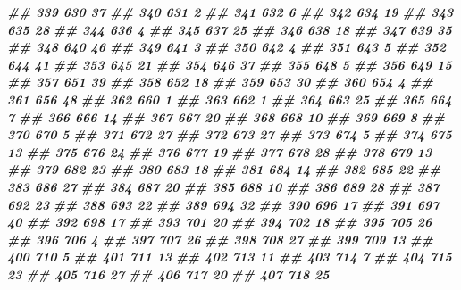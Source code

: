 \documentclass[
]{book}
\newenvironment{Shaded}{\begin{snugshade}}{\end{snugshade}}
\newcommand{\DocumentationTok}[1]{\textcolor[rgb]{0.56,0.35,0.01}{\textbf{\textit{#1}}}}
\theoremstyle{definition}
\theoremstyle{definition}
\theoremstyle{definition}
\theoremstyle{definition}
\theoremstyle{remark}
\begin{document}
\begin{Shaded}
\begin{Highlighting}[]
\DocumentationTok{\#\# 339    630 37}
\DocumentationTok{\#\# 340    631  2}
\DocumentationTok{\#\# 341    632  6}
\DocumentationTok{\#\# 342    634 19}
\DocumentationTok{\#\# 343    635 28}
\DocumentationTok{\#\# 344    636  4}
\DocumentationTok{\#\# 345    637 25}
\DocumentationTok{\#\# 346    638 18}
\DocumentationTok{\#\# 347    639 35}
\DocumentationTok{\#\# 348    640 46}
\DocumentationTok{\#\# 349    641  3}
\DocumentationTok{\#\# 350    642  4}
\DocumentationTok{\#\# 351    643  5}
\DocumentationTok{\#\# 352    644 41}
\DocumentationTok{\#\# 353    645 21}
\DocumentationTok{\#\# 354    646 37}
\DocumentationTok{\#\# 355    648  5}
\DocumentationTok{\#\# 356    649 15}
\DocumentationTok{\#\# 357    651 39}
\DocumentationTok{\#\# 358    652 18}
\DocumentationTok{\#\# 359    653 30}
\DocumentationTok{\#\# 360    654  4}
\DocumentationTok{\#\# 361    656 48}
\DocumentationTok{\#\# 362    660  1}
\DocumentationTok{\#\# 363    662  1}
\DocumentationTok{\#\# 364    663 25}
\DocumentationTok{\#\# 365    664  7}
\DocumentationTok{\#\# 366    666 14}
\DocumentationTok{\#\# 367    667 20}
\DocumentationTok{\#\# 368    668 10}
\DocumentationTok{\#\# 369    669  8}
\DocumentationTok{\#\# 370    670  5}
\DocumentationTok{\#\# 371    672 27}
\DocumentationTok{\#\# 372    673 27}
\DocumentationTok{\#\# 373    674  5}
\DocumentationTok{\#\# 374    675 13}
\DocumentationTok{\#\# 375    676 24}
\DocumentationTok{\#\# 376    677 19}
\DocumentationTok{\#\# 377    678 28}
\DocumentationTok{\#\# 378    679 13}
\DocumentationTok{\#\# 379    682 23}
\DocumentationTok{\#\# 380    683 18}
\DocumentationTok{\#\# 381    684 14}
\DocumentationTok{\#\# 382    685 22}
\DocumentationTok{\#\# 383    686 27}
\DocumentationTok{\#\# 384    687 20}
\DocumentationTok{\#\# 385    688 10}
\DocumentationTok{\#\# 386    689 28}
\DocumentationTok{\#\# 387    692 23}
\DocumentationTok{\#\# 388    693 22}
\DocumentationTok{\#\# 389    694 32}
\DocumentationTok{\#\# 390    696 17}
\DocumentationTok{\#\# 391    697 40}
\DocumentationTok{\#\# 392    698 17}
\DocumentationTok{\#\# 393    701 20}
\DocumentationTok{\#\# 394    702 18}
\DocumentationTok{\#\# 395    705 26}
\DocumentationTok{\#\# 396    706  4}
\DocumentationTok{\#\# 397    707 26}
\DocumentationTok{\#\# 398    708 27}
\DocumentationTok{\#\# 399    709 13}
\DocumentationTok{\#\# 400    710  5}
\DocumentationTok{\#\# 401    711 13}
\DocumentationTok{\#\# 402    713 11}
\DocumentationTok{\#\# 403    714  7}
\DocumentationTok{\#\# 404    715 23}
\DocumentationTok{\#\# 405    716 27}
\DocumentationTok{\#\# 406    717 20}
\DocumentationTok{\#\# 407    718 25}

\end{Highlighting}
\end{Shaded}
\end{document}
